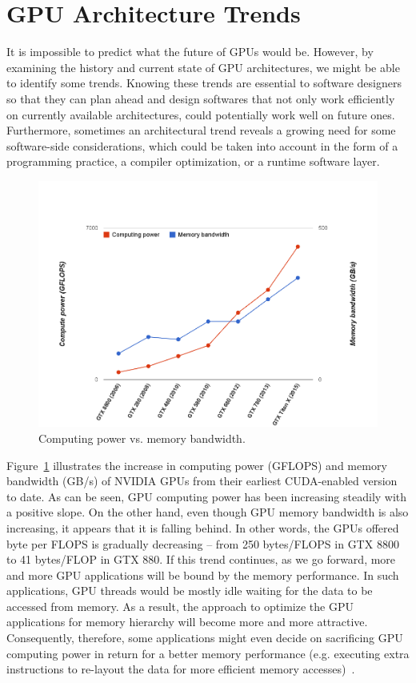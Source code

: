 \section{GPU Architecture Trends}

It is impossible to predict what the future of GPUs would be. However, by
examining the history and current state of GPU architectures, we might be able
to identify some trends. Knowing these trends are essential to software
designers so that they can plan ahead and design softwares that not only work
efficiently on currently available architectures, could potentially work
well on future ones. Furthermore, sometimes an architectural trend reveals a
growing need for some software-side considerations, which could be taken into
account in the form of a programming practice, a compiler optimization, or a
runtime software layer.

\begin{figure}[t]
\includegraphics[scale=0.5]{computevsmemory.png}
\caption{Computing power vs. memory bandwidth.}
\label{fig:computevsmemory}
\end{figure}



Figure~\ref{fig:computevsmemory} illustrates the increase in computing power
(GFLOPS) and memory bandwidth (GB/s) of NVIDIA GPUs from their earliest
CUDA-enabled version to date. As can be seen, GPU computing power has been
increasing steadily with a positive slope. On the other hand, even though GPU
memory bandwidth is also increasing, it appears that it is falling behind. In
other words, the GPUs offered byte per FLOPS is gradually decreasing -- from
250 bytes/FLOPS in GTX 8800 to 41 bytes/FLOP in GTX 880. If this trend
continues, as we go forward, more and more GPU applications will be bound by
the memory performance. In such applications, GPU threads would be mostly idle
waiting for the data to be accessed from memory. As a result, the approach to
optimize the GPU applications for memory hierarchy will become more and more
attractive. Consequently, therefore, some applications might even decide on
sacrificing GPU computing power in return for a better memory performance (e.g.
executing extra instructions to re-layout the data for more efficient memory
accesses)~\cite{}.


